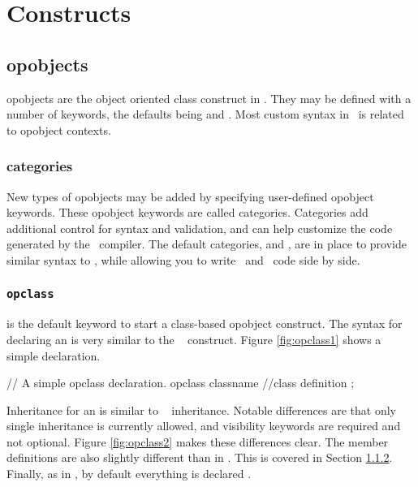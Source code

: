 
\chapter{Constructs}
\label{chap:constructs}

\section{opobjects}
\label{sec:opobject}

opobjects are the object oriented class construct in \opCPP.  They may be defined with a number of keywords, the defaults being  and .  Most custom syntax in \opCPP\ is related to opobject contexts.

\subsection{categories}

New types of opobjects may be added by specifying user-defined opobject keywords.  These opobject keywords are called categories.  Categories add additional control for syntax and validation, and can help customize the code generated by the \opCPP\ compiler.   The default categories,  and , are in place to provide similar syntax to \cpp, while allowing you to write \opCPP\ and \cpp\ code side by side.

\subsection{{\tt opclass}}

 is the default keyword to start a class-based opobject construct.  The syntax for declaring an is very similar to the \cpp\  construct.  Figure \ref{fig:opclass1} shows a simple  declaration.

\begin{opcpp}[label={fig:opclass1},caption={A simple \opcppK{opclass} declaration in \opCPP.}]
// A simple opclass declaration.
opclass classname
{
	//class definition
};
\end{opcpp}

Inheritance for an  is similar to \cpp\  inheritance.  Notable differences are that only single inheritance is currently allowed, and visibility keywords are required and not optional.  Figure \ref{fig:opclass2} makes these differences clear.  The member definitions are also slightly different than in \cpp.  This is covered in Section \ref{}.  Finally, as in \cpp, by default everything is declared .


